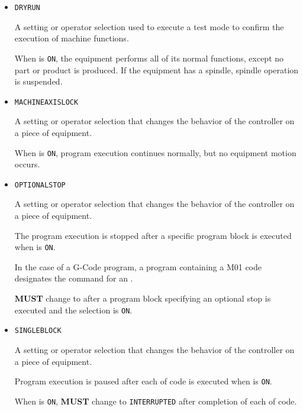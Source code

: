 \begin{itemize}

\item \texttt{DRY\textunderscore RUN}


A setting or operator selection used to execute a test mode to confirm the execution of machine functions. 

When  is \texttt{ON}, the equipment performs all of its normal functions, except no part or product is produced.  If the equipment has a spindle, spindle operation is suspended.

\item \texttt{MACHINE\textunderscore AXIS\textunderscore LOCK}


A setting or operator selection that changes the behavior of the controller on a piece of equipment. 
 
When  is \texttt{ON}, program execution continues normally, but no equipment motion occurs.

\item \texttt{OPTIONAL\textunderscore STOP}


A setting or operator selection that changes the behavior of the controller on a piece of equipment. 

The program execution is stopped after a specific program block is executed when  is \texttt{ON}.    

In the case of a G-Code program, a program  containing a M01 code designates the command for an . 

 \textbf{MUST} change to  after a program block specifying an optional stop is executed and the  selection is \texttt{ON}.

\item \texttt{SINGLE\textunderscore BLOCK}


A setting or operator selection that changes the behavior of the controller on a piece of equipment. 

Program execution is paused after each  of code is executed when  is \texttt{ON}.   

 When  is \texttt{ON},  \textbf{MUST} change to \texttt{INTERRUPTED} after completion of each  of code. 


\end{itemize}
